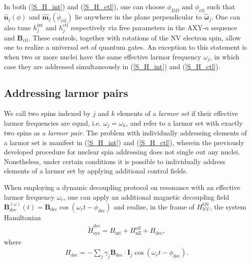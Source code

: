 \documentclass[twocolumn]{revtex4-1}
\renewcommand{\t}{\text} %
\newcommand{\p}[1]{\left(#1\right)} %
\renewcommand{\v}{\bm} %
\newcommand{\uv}[1]{\hat{\v{#1}}} %
\renewcommand{\c}{\cdot} %
\newcommand{\NV}{\t{NV}}
\begin{document}
In both (\ref{S_H_int}) and (\ref{S_H_ctl}), one can choose
$\phi_{DD}$ and $\phi_\t{ctl}$ such that $\uv n_j\p\phi$ and
$\uv m_j\p{\phi_\t{ctl}}$ lie anywhere in the plane perpendicular to
$\uv\omega_j$. One can also tune $h_j^\t{int}$ and $h_j^\t{ctl}$
respectively via free parameters in the AXY-$n$ sequence and
$\v B_\t{ctl}$. These controls, together with rotations of the NV
electron spin, allow one to realize a universal set of quantum
gates. An exception to this statement is when two or more nuclei have
the same effective larmor frequency $\omega_j$, in which case they are
addressed simultaneously in (\ref{S_H_int}) and (\ref{S_H_ctl}).

\subsection{Addressing larmor pairs}

We call two spins indexed by $j$ and $k$ elements of a \emph{larmor
  set} if their effective larmor frequencies are equal,
i.e. $\omega_j=\omega_k$, and refer to a larmor set with exactly two
spins as a \emph{larmor pair}. The problem with individually
addressing elements of a larmor set is manifest in (\ref{S_H_int}) and
(\ref{S_H_ctl}), wherein the previously developed procedure for
nuclear spin addressing does not single out any nuclei. Nonetheless,
under certain conditions it is possible to individually address
elements of a larmor set by applying additional control fields.

When employing a dynamic decoupling protocol on resonance with an
effective larmor frequency $\omega_r$, one can apply an additional
magnetic decoupling field
$\v B_\t{dec}^{\p\omega}\p{t}=\v B_\t{dec}\cos\p{\omega_r
  t-\phi_\t{dec}}$ and realize, in the frame of $H_\NV^\t{GS}$, the
system Hamiltonian
\begin{align}
  \tilde H_\t{sys}^\t{dec} = H_\t{int} + H_\t{nZ}^\t{eff} + H_\t{dec},
\end{align}
where
\begin{align}
  H_\t{dec} = -\sum_j\gamma_j\v B_\t{dec}\c\v I_j
  \cos\p{\omega_rt-\phi_\t{dec}}.
\end{align}
\end{document}
